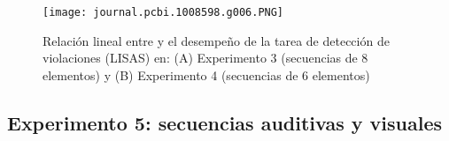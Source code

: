 \begin{figure}[t!]
   \texttt{[image: journal.pcbi.1008598.g006.PNG]}
   \centering
   \caption{Relación lineal entre \mdlbin y el desempeño de la tarea de detección de violaciones (LISAS) en: (A) Experimento 3 (secuencias de 8 elementos) y (B) Experimento 4 (secuencias de 6 elementos)}
   \label{PlosBIO-F6}
\end{figure}

\subsection{Experimento 5: secuencias auditivas y visuales}


